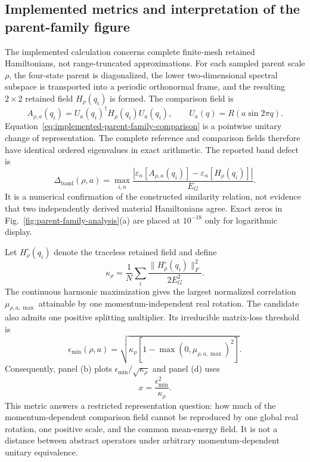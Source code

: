 \documentclass[11pt]{article}
\begin{document}
\subsection{Implemented metrics and interpretation of the parent-family figure}

The implemented calculation concerns complete finite-mesh retained Hamiltonians, not
range-truncated approximations. For each sampled parent scale $\rho$, the four-state
parent is diagonalized, the lower two-dimensional spectral subspace is transported into
a periodic orthonormal frame, and the resulting $2\times2$ retained field $H_\rho(q_i)$
is formed. The comparison field is
\begin{equation}
 A_{\rho,a}(q_i)=U_a(q_i)^\dagger H_\rho(q_i)U_a(q_i),
 \qquad U_a(q)=R(a\sin 2\pi q).
 \label{eq:implemented-parent-family-comparison}
\end{equation}
Equation~\eqref{eq:implemented-parent-family-comparison} is a pointwise unitary change of
representation. The complete reference and comparison fields therefore have identical
ordered eigenvalues in exact arithmetic. The reported band defect is
\begin{equation}
 \Delta_{\mathrm{band}}(\rho,a)=
 \max_{i,n}\frac{|\varepsilon_n[A_{\rho,a}(q_i)]
                       -\varepsilon_n[H_\rho(q_i)]|}{E_G}.
 \label{eq:implemented-band-defect}
\end{equation}
It is a numerical confirmation of the constructed similarity relation, not evidence that
two independently derived material Hamiltonians agree. Exact zeros in
Fig.~\ref{fig:parent-family-analysis}(a) are placed at $10^{-18}$ only for logarithmic
display.

Let $H_\rho^\circ(q_i)$ denote the traceless retained field and define
\begin{equation}
 \kappa_\rho=\frac{1}{N}\sum_i
 \frac{\|H_\rho^\circ(q_i)\|_F^2}{2E_G^2}.
 \label{eq:implemented-splitting-scale}
\end{equation}
The continuous harmonic maximization gives the largest normalized correlation
$\mu_{\rho,a,\max}$ attainable by one momentum-independent real rotation. The candidate
also admits one positive splitting multiplier. Its irreducible matrix-loss threshold is
\begin{equation}
 \epsilon_{\min}(\rho,a)
 =\sqrt{\kappa_\rho\left[1-\max(0,\mu_{\rho,a,\max})^2\right]}.
 \label{eq:implemented-minimum-threshold}
\end{equation}
Consequently, panel (b) plots $\epsilon_{\min}/\sqrt{\kappa_\rho}$ and panel (d) uses
\begin{equation}
 x=\frac{\epsilon_{\min}^2}{\kappa_\rho}.
 \label{eq:implemented-normalized-residual}
\end{equation}
This metric answers a restricted representation question: how much of the
momentum-dependent comparison field cannot be reproduced by one global real rotation,
one positive scale, and the common mean-energy field. It is not a distance between
abstract operators under arbitrary momentum-dependent unitary equivalence.
\end{document}
